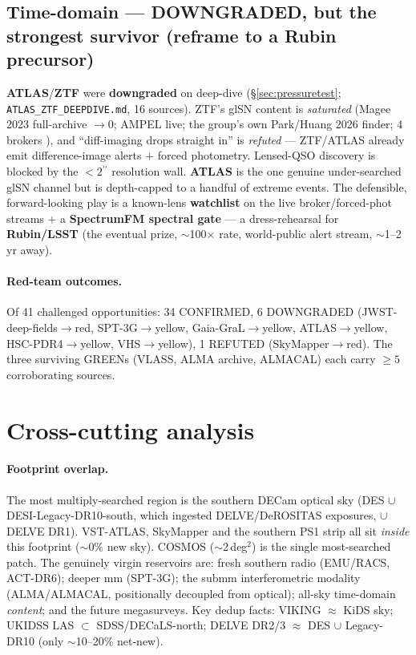 \documentclass[11pt,letterpaper]{article}
\providecommand{\arcsec}{\ensuremath{^{\prime\prime}}}
\newcommand{\survey}[1]{\textbf{#1}}
\begin{document}
\subsection{Time-domain --- DOWNGRADED, but the strongest survivor (reframe to a Rubin precursor)}
\survey{ATLAS}/\survey{ZTF} were \textbf{downgraded} on deep-dive (\S\ref{sec:pressuretest};
\texttt{ATLAS\_ZTF\_DEEPDIVE.md}, 16 sources). ZTF's glSN content is \emph{saturated} (Magee 2023
full-archive $\to$0; AMPEL live; the group's own Park/Huang 2026 finder; 4 brokers
\citep{goobar2023,townsend2025}), and ``diff-imaging drops straight in'' is \emph{refuted} ---
ZTF/ATLAS already emit difference-image alerts $+$ forced photometry. Lensed-QSO discovery is
blocked by the $<2\arcsec$ resolution wall. \survey{ATLAS} is the one genuine under-searched glSN
channel but is depth-capped to a handful of extreme events. The defensible, forward-looking play is a
known-lens \textbf{watchlist} on the live broker/forced-phot streams $+$ a \textbf{SpectrumFM
spectral gate} --- a dress-rehearsal for \survey{Rubin/LSST} (the eventual prize, $\sim$100$\times$
rate, world-public alert stream, $\sim$1--2\,yr away).

\paragraph{Red-team outcomes.} Of 41 challenged opportunities: 34 CONFIRMED, 6 DOWNGRADED
(JWST-deep-fields$\to$red, SPT-3G$\to$yellow, Gaia-GraL$\to$yellow, ATLAS$\to$yellow,
HSC-PDR4$\to$yellow, VHS$\to$yellow), 1 REFUTED (SkyMapper$\to$red). The three surviving GREENs
(VLASS, ALMA archive, ALMACAL) each carry $\ge 5$ corroborating sources.

\section{Cross-cutting analysis}
\paragraph{Footprint overlap.} The most multiply-searched region is the southern DECam optical
sky (DES $\cup$ DESI-Legacy-DR10-south, which ingested DELVE/DeROSITAS exposures, $\cup$ DELVE
DR1). VST-ATLAS, SkyMapper and the southern PS1 strip all sit \emph{inside} this footprint
($\sim$0\% new sky). COSMOS ($\sim$2\,deg$^2$) is the single most-searched patch. The genuinely
virgin reservoirs are: fresh southern
radio (EMU/RACS, ACT-DR6); deeper mm (SPT-3G); the submm interferometric modality (ALMA/ALMACAL,
positionally decoupled from optical); all-sky time-domain \emph{content}; and the future
megasurveys. Key dedup facts: VIKING $\approx$ KiDS sky; UKIDSS LAS $\subset$ SDSS/DECaLS-north;
DELVE DR2/3 $\approx$ DES $\cup$ Legacy-DR10 (only $\sim$10--20\% net-new).
\end{document}
